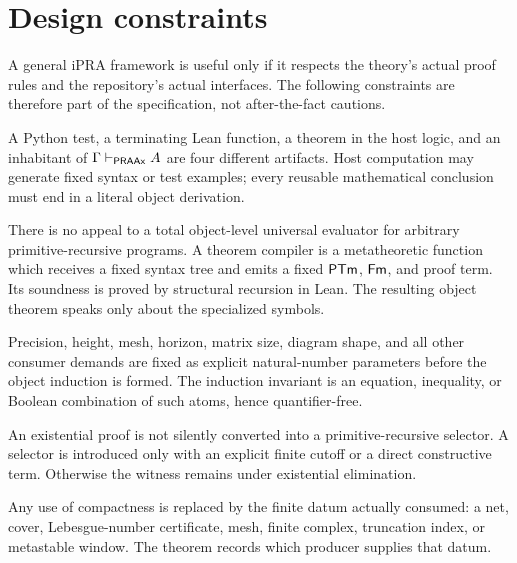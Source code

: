\section{Design constraints}
\label{sec:constraints}

A general iPRA framework is useful only if it respects the theory's actual
proof rules and the repository's actual interfaces.  The following constraints
are therefore part of the specification, not after-the-fact cautions.

\begin{principle}
A Python test, a terminating Lean function, a theorem in the host logic, and an
inhabitant of \(\Gamma\mathrel{\vdash_{\mathsf{PRAAx}}} A\) are four different artifacts.  Host
computation may generate fixed syntax or test examples; every reusable
mathematical conclusion must end in a literal object derivation.
\end{principle}

\begin{principle}
There is no appeal to a total object-level universal evaluator for arbitrary
primitive-recursive programs.  A theorem compiler is a metatheoretic function
which receives a fixed syntax tree and emits a fixed \(\mathsf{PTm}\), \(\mathsf{Fm}\), and
proof term.  Its soundness is proved by structural recursion in Lean.  The
resulting object theorem speaks only about the specialized symbols.
\end{principle}

\begin{principle}
Precision, height, mesh, horizon, matrix size, diagram shape, and all other
consumer demands are fixed as explicit natural-number parameters before the
object induction is formed.  The induction invariant is an equation,
inequality, or Boolean combination of such atoms, hence quantifier-free.
\end{principle}

\begin{principle}
An existential proof is not silently converted into a primitive-recursive
selector.  A selector is introduced only with an explicit finite cutoff or a
direct constructive term.  Otherwise the witness remains under existential
elimination.
\end{principle}

\begin{principle}
Any use of compactness is replaced by the finite datum actually consumed:
a net, cover, Lebesgue-number certificate, mesh, finite complex, truncation
index, or metastable window.  The theorem records which producer supplies that
datum.
\end{principle}

